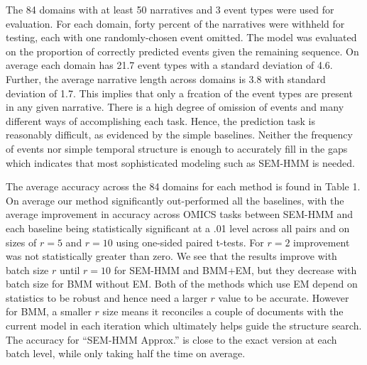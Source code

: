 \documentclass[letterpaper]{article}
\begin{document}
The 84 domains with at least 50 narratives and 3 event types were used for evaluation.
For each domain, forty percent of the narratives were withheld for testing, each with one randomly-chosen event omitted.  The model was evaluated on the proportion of correctly predicted events given the remaining sequence.
On average each domain has 21.7 event types with a standard deviation of 4.6.  Further, the average narrative length across domains is 3.8 with standard deviation of 1.7.  This implies that 
only a frcation of the event types are present in any given narrative.  
There is a high degree of omission of events and many different ways of accomplishing each task.
Hence, the prediction task is reasonably difficult, as evidenced by the simple baselines.  
Neither the frequency of events nor simple temporal structure is enough to accurately fill in the gaps which indicates that most sophisticated modeling such as SEM-HMM is needed.

The average accuracy across the 84 domains for each method is found in Table 1. 
On average our method significantly out-performed all the baselines, with the average improvement in accuracy across OMICS tasks between SEM-HMM and each baseline being statistically significant at a .01 level across all pairs and on sizes of $r = 5$ and $r= 10$ using one-sided paired t-tests.  For $r=2$ improvement was not statistically greater than zero. %
We see that the results improve with batch size $r$ until $r=10$ for 
SEM-HMM and BMM+EM, but they decrease with batch size for BMM without EM.
Both of the methods which use EM depend on statistics to be robust and hence need a larger $r$ value to be accurate.  However for BMM, a smaller $r$ size means it reconciles a couple of documents with the current model in each iteration which ultimately helps guide the structure search. 
The accuracy for ``SEM-HMM Approx.'' is close to the exact version at each batch level, while only taking half the time on average.  
\end{document}
